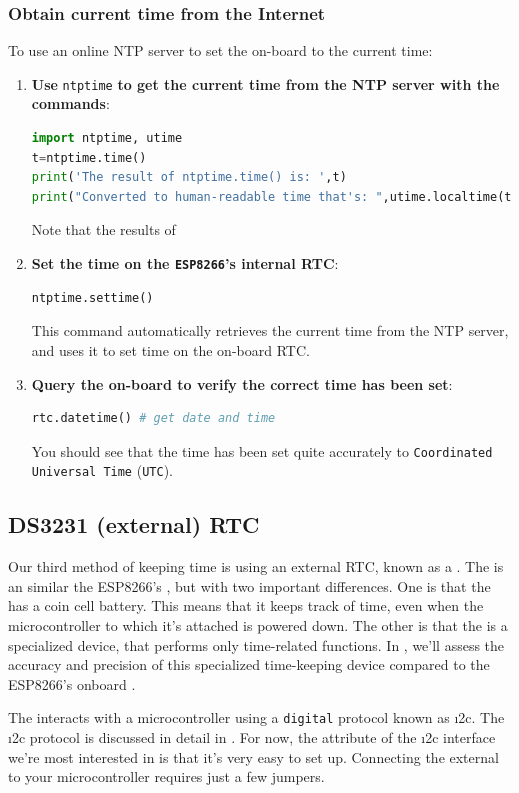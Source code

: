 \subsubsection{\howto Obtain current time from the Internet}
To use an online NTP server to set the on-board \rtc to the current time:
\begin{enumerate}
	\item \textbf{Use} \lstinline{ntptime} \textbf{to get the current time from the NTP server with the commands}:
\begin{lstlisting}[language=Python]
import ntptime, utime
t=ntptime.time()
print('The result of ntptime.time() is: ',t)
print("Converted to human-readable time that's: ",utime.localtime(t))
\end{lstlisting}
	Note that the results of \lstinline{}
	\item \textbf{Set the time on the \texttt{ESP8266}’s internal RTC}:
\begin{lstlisting}[language=Python]
ntptime.settime()
\end{lstlisting}
	This command automatically retrieves the current time from the NTP server, and uses it to set time on the on-board RTC.
	\item \textbf{Query the on-board \rtc to verify the correct time has been set}:
\begin{lstlisting}[language=Python]
rtc.datetime() # get date and time
\end{lstlisting}
	You should see that the time has been set quite accurately to \texttt{Coordinated Universal Time} (\texttt{UTC}). 
\end{enumerate}


\subsection{DS3231 (external) RTC}
Our third method of keeping time is using an external RTC, known as a .
The  is an \rtc similar the ESP8266's \rtc, but with two important differences. 
One is that the  has a coin cell battery.
This means that it keeps track of time, even when the microcontroller to which it's attached is powered down.
The other is that the  is a specialized device, that performs only time-related functions. 
In , we'll assess the accuracy and precision of this specialized time-keeping device compared to the ESP8266's onboard \rtc.

The  interacts with a microcontroller using a \texttt{digital} protocol known as \i2c. 
The \i2c protocol is discussed in detail in .
For now, the attribute of the \i2c interface we're most interested in is that it's very easy to set up. 
Connecting the  external \rtc to your microcontroller requires just a few jumpers. 


